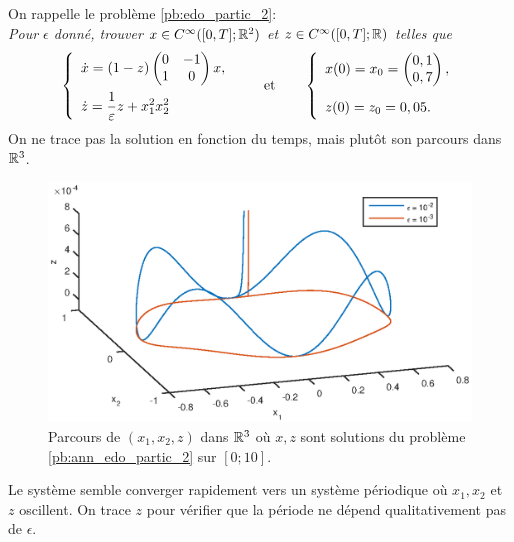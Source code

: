On rappelle le problème \eqref{pb:edo_partic_2}: \\
{\itshape{}Pour $\epsilon$ donné, trouver $x \in C^{\infty}([0,T];\mathbb{R}^2)$ et $z \in C^{\infty}([0,T]; \mathbb{R})$ telles que} 
\begin{equation} \label{pb:ann_edo_partic_2}
\left\{ \begin{array}{l}
\dot{x} = (1-z)\begin{pmatrix} 0 & -1 \\ 1 & 0 \end{pmatrix} x , \\ \displaystyle
\dot{z} = \frac{1}{\varepsilon} z + x_1^2 x_2^2 \vphantom{\displaystyle\sum^0}
\end{array} \right. 
\qquad \text{et} \qquad 
\left\{ \begin{array}{l}
x(0) = x_0 = \begin{pmatrix} 0,1 \\ 0,7 \end{pmatrix} , \\
z(0) = z_0 = 0,05 . \vphantom{\displaystyle\sum^0}
\end{array} \right.
\end{equation}
On ne trace pas la solution en fonction du temps, mais plutôt son parcours dans $\mathbb{R}^3$. 
\begin{figure}[!h]
\centering
\includegraphics[width=.9\textwidth]{img/ann/solution_cas2.eps}
\caption{Parcours de $(x_1,x_2,z)$ dans $\mathbb{R}^3$ où $x,z$ sont solutions du problème \eqref{pb:ann_edo_partic_2} sur $[0; 10]$.}
\end{figure}

Le système semble converger rapidement vers un système périodique où $x_1,x_2$ et $z$ oscillent. 
On trace $z$ pour vérifier que la période ne dépend qualitativement pas de $\epsilon$.

